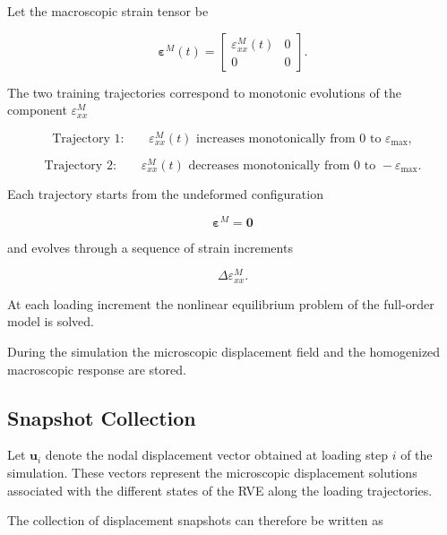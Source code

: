 \documentclass[11pt,a4paper]{article}
\begin{document}
Let the macroscopic strain tensor be

\begin{equation}
\boldsymbol{\varepsilon}^{M}(t)
=
\begin{bmatrix}
\varepsilon_{xx}^{M}(t) & 0 \\
0 & 0
\end{bmatrix}.
\end{equation}

The two training trajectories correspond to monotonic evolutions of the component $\varepsilon_{xx}^{M}$

\begin{equation}
\text{Trajectory 1:} \qquad
\varepsilon_{xx}^{M}(t) \text{ increases monotonically from } 0 \text{ to } \varepsilon_{\max},
\end{equation}

\begin{equation}
\text{Trajectory 2:} \qquad
\varepsilon_{xx}^{M}(t) \text{ decreases monotonically from } 0 \text{ to } -\varepsilon_{\max}.
\end{equation}

Each trajectory starts from the undeformed configuration

\begin{equation}
\boldsymbol{\varepsilon}^{M} = \mathbf{0}
\end{equation}

and evolves through a sequence of strain increments

\begin{equation}
\Delta \varepsilon_{xx}^{M}.
\end{equation}

At each loading increment the nonlinear equilibrium problem of the full-order model is solved.

During the simulation the microscopic displacement field and the homogenized macroscopic response are stored.

\subsection{Snapshot Collection}

Let $\mathbf{u}_i$ denote the nodal displacement vector obtained at loading step $i$ of the simulation. These vectors represent the microscopic displacement solutions associated with the different states of the RVE along the loading trajectories.

The collection of displacement snapshots can therefore be written as
\end{document}
